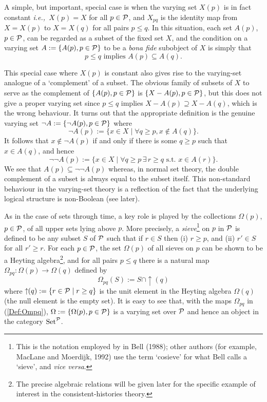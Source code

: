 \documentclass[12pt]{article}
\newcounter{def-number}[section]
\newcommand{\beq}{\begin{equation}}
\newcommand{\eeq}{\end{equation}}
\newcommand{\eq}[1]{(\ref{#1})}
\newcommand{\ie}{{\em i.e.,\ }}
\newcommand{\map}{\rightarrow}
\newcommand{\up}[1]{\uparrow\!\!(#1)}
\newcommand{\Om}{\Omega}
\newcommand{\Set}{{\rm Set}}
\begin{document}
	A simple, but important, special case is when the varying set
$X(p)$ is in fact constant \ie $X(p)=X$ for all $p\in\cal P$, and
$X_{pq}$ is the identity map from $X=X(p)$ to $X=X(q)$ for all pairs
$p\leq q$. In this situation, each set $A(p)$, $p\in\cal P$, can be
regarded as a subset of the fixed set $X$, and the condition on a
varying set $A:=\{A(p),p\in{\cal P}\}$ to be a {\em bona fide\/}
subobject of $X$ is simply that
\beq
		p\leq q\mbox{ implies } A(p)\subseteq A(q).	\label{sub-ob}
\eeq

	This special case where $X(p)$ is constant also gives rise to
the varying-set analogue of a `complement' of a subset. The obvious
family of subsets of $X$ to serve as the complement of $\{A(p),
p\in{\cal P}\}$ is $\{X-A(p),p\in{\cal P}\}$, but this does not give
a proper varying set since $p\leq q$ implies $X-A(p)\supseteq
X-A(q)$, which is the wrong behaviour. It turns out that the
appropriate definition is the genuine varying set $\neg A:=\{\neg
A(p),p\in{\cal P}\}$ where
\beq
	\neg A(p):=\{x\in X\mid \forall q\geq p, x\not\in A(q)\}.
										\label{Def:negA(p)}	
\eeq
It follows that $x\not\in\neg A(p)$ if and only if there is some
$q\geq p$ such that $x\in A(q)$, and hence
\beq
	\neg\neg A(p):=\{x\in X\mid \forall q\geq p\,\exists\, r\geq q
					\mbox{ s.t. }x\in A(r)\}.
\eeq
We see that $A(p)\subseteq\neg\neg A(p)$ whereas, in normal set
theory, the double complement of a subset is
always equal to the subset itself.  This non-standard behaviour in the
varying-set theory is a reflection of the fact that the underlying
logical structure is non-Boolean (see later). 

	As in the case of sets through time, a key role is played
by the collections $\Om(p)$, $p\in\cal P$, of all upper sets lying
above $p$.  More precisely, a {\em sieve\/}\footnote{This is the
notation employed by in Bell (1988); other authors (for example,
MacLane and Moerdijk, 1992) use the term `cosieve' for what Bell
calls a `sieve', and {\em vice versa}.} on $p$ in $\cal P$ is
defined to be any subset $S$ of $\cal P$ such that if $r\in S$ then
(i) $r\geq p$, and (ii) $r'\in S$ for all $r'\geq r$.  For each
$p\in\cal P$, the set $\Om(p)$ of all sieves on $p$ can be shown to
be a Heyting algebra\footnote{The precise algebraic relations will
be given later for the specific example of interest in the
consistent-histories theory.}, and for all pairs $p\leq q$ there is
a natural map $\Om_{pq}:\Om(p)\map\Om(q)$ defined by
\beq
		\Om_{pq}(S):=S\cap\up{q}				\label{Def:Ompq}
\eeq 
where $\up{q}:=\{r\in{\cal P}\mid r\geq q\}$ is the unit element
in the Heyting algebra $\Om(q)$ (the null element is the empty set).
It is easy to see that, with the maps $\Om_{pq}$ in \eq{Def:Ompq},
$\Om:=\{\Om(p),p\in{\cal P}\}$ is a varying set over $\cal P$
and hence an object in the category $\Set^{\cal P}$.
\end{document}
